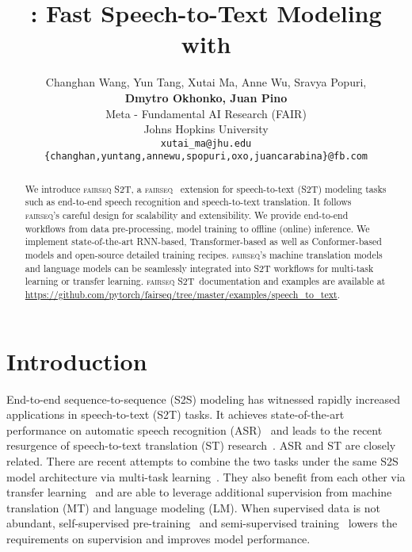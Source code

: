 \documentclass[11pt,a4paper]{article}
\title{\stot: Fast Speech-to-Text Modeling with \fairseq}
\author{Changhan Wang, Yun Tang, Xutai Ma, Anne Wu, Sravya Popuri, \\\textbf{Dmytro Okhonko, Juan Pino} \vspace*{0.2cm} \\
Meta - Fundamental AI Research (FAIR) \\
Johns Hopkins University \vspace*{0.2cm} \\
  {\tt xutai\_\thinspace ma@jhu.edu} \\
\texttt{\{changhan,yuntang,annewu,spopuri,oxo,juancarabina\}@fb.com} \\
}
\date{}
\newcommand{\fairseq}{\textsc{fairseq}}
\newcommand{\stot}{\textsc{fairseq S2T}}
\begin{document}
\maketitle
\begin{abstract}
We introduce \stot, a \fairseq~\citep{ott2019fairseq} extension for speech-to-text (S2T) modeling tasks such as end-to-end speech recognition and speech-to-text translation. It follows \fairseq's careful design for scalability and extensibility. We provide end-to-end workflows from data pre-processing, model training to offline (online) inference. We implement state-of-the-art RNN-based, Transformer-based as well as Conformer-based models and open-source detailed training recipes. \fairseq's machine translation models and language models can be seamlessly integrated into S2T workflows for multi-task learning or transfer learning. \stot~documentation and examples are available at \url{https://github.com/pytorch/fairseq/tree/master/examples/speech_to_text}.
\end{abstract}

\section{Introduction}


End-to-end sequence-to-sequence (S2S) modeling has witnessed rapidly increased applications in speech-to-text (S2T) tasks. It achieves state-of-the-art performance on automatic speech recognition (ASR)~\citep{park2019specaugment,synnaeve2019end} and leads to the recent resurgence of speech-to-text translation (ST) research~\citep{duong2016attentional,berard2016listen}. ASR and ST are closely related. There are recent attempts to combine the two tasks under the same S2S model architecture via multi-task learning~\citep{anastasopoulos2018tied,liu2019synchronous}. They also benefit from each other via transfer learning~\citep{bansal2018pre,wang2020improving} and are able to leverage additional supervision from machine translation (MT) and language modeling (LM). When supervised data is not abundant, self-supervised pre-training~\citep{Schneider2019,wu2020selfsupervised} and semi-supervised training~\citep{Kahn2020SelfTrainingFE,pino2020selftraining} lowers the requirements on supervision and improves model performance.
\end{document}
